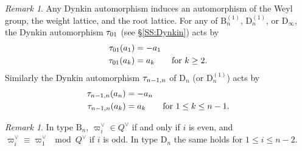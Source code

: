\documentclass[a4paper]{amsart}
\newcommand{\ike}[1]{\todo[size=\tiny,color=blue!30]{#1}}
\newcommand{\koushik}[1]{\todo[size=\tiny,color=green!30]{#1}}
\theoremstyle{remark}
\newtheorem{remark}[thm]{Remark}
\numberwithin{equation}{section}
\begin{document}
\begin{remark} \label{R:switching Dynkin autos}
Any Dynkin automorphism induces an automorphism of the Weyl group, 
the weight lattice, and the root lattice. 
For any of $\mathrm{B}_n^{(1)}$, $\mathrm{D}_n^{(1)}$, or $\mathrm{D}_\infty$, the Dynkin automorphism $\tau_{01}$ (see \S \ref{SS:Dynkin}) acts by
\begin{align}\label{E:auto 0}
\tau_{01}(a_1) &= -a_1 \\
\tau_{01}(a_k) &= a_k \qquad\text{for $k\ge 2$.}
\end{align}
Similarly the Dynkin automorphism $\tau_{n-1,n}$ of $\mathrm{D}_n$ (or $\mathrm{D}_n^{(1)}$) acts by 
\begin{align}\label{E:auto n}
\tau_{n-1,n}(a_n) &= -a_n \\
\tau_{n-1,n}(a_k) &= a_k \qquad\text{for $1\le k\le n-1$.}
\end{align}
\end{remark}
\begin{remark}\label{R:cosets of coweights}
In type $\mathrm{B}_n$, $\varpi_i^\lor\in Q^\lor$ if and only if $i$ is even,
and $\varpi_i^\lor\equiv \varpi_1^\lor \mod Q^\lor$ if $i$ is odd.
In type $\mathrm{D}_n$ the same holds for $1\le i\le n-2$. 
\end{remark}

\end{document}
